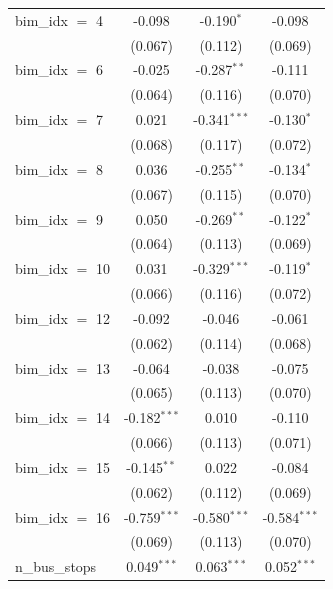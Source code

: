 \begin{tabular}{lccc}
   bim\_idx $=$ 4      & -0.098         & -0.190$^{*}$   & -0.098\\   
                       & (0.067)        & (0.112)        & (0.069)\\   
   bim\_idx $=$ 6      & -0.025         & -0.287$^{**}$  & -0.111\\   
                       & (0.064)        & (0.116)        & (0.070)\\   
   bim\_idx $=$ 7      & 0.021          & -0.341$^{***}$ & -0.130$^{*}$\\   
                       & (0.068)        & (0.117)        & (0.072)\\   
   bim\_idx $=$ 8      & 0.036          & -0.255$^{**}$  & -0.134$^{*}$\\   
                       & (0.067)        & (0.115)        & (0.070)\\   
   bim\_idx $=$ 9      & 0.050          & -0.269$^{**}$  & -0.122$^{*}$\\   
                       & (0.064)        & (0.113)        & (0.069)\\   
   bim\_idx $=$ 10     & 0.031          & -0.329$^{***}$ & -0.119$^{*}$\\   
                       & (0.066)        & (0.116)        & (0.072)\\   
   bim\_idx $=$ 12     & -0.092         & -0.046         & -0.061\\   
                       & (0.062)        & (0.114)        & (0.068)\\   
   bim\_idx $=$ 13     & -0.064         & -0.038         & -0.075\\   
                       & (0.065)        & (0.113)        & (0.070)\\   
   bim\_idx $=$ 14     & -0.182$^{***}$ & 0.010          & -0.110\\   
                       & (0.066)        & (0.113)        & (0.071)\\   
   bim\_idx $=$ 15     & -0.145$^{**}$  & 0.022          & -0.084\\   
                       & (0.062)        & (0.112)        & (0.069)\\   
   bim\_idx $=$ 16     & -0.759$^{***}$ & -0.580$^{***}$ & -0.584$^{***}$\\   
                       & (0.069)        & (0.113)        & (0.070)\\   
   n\_bus\_stops       & 0.049$^{***}$  & 0.063$^{***}$  & 0.052$^{***}$\\   

\end{tabular}
